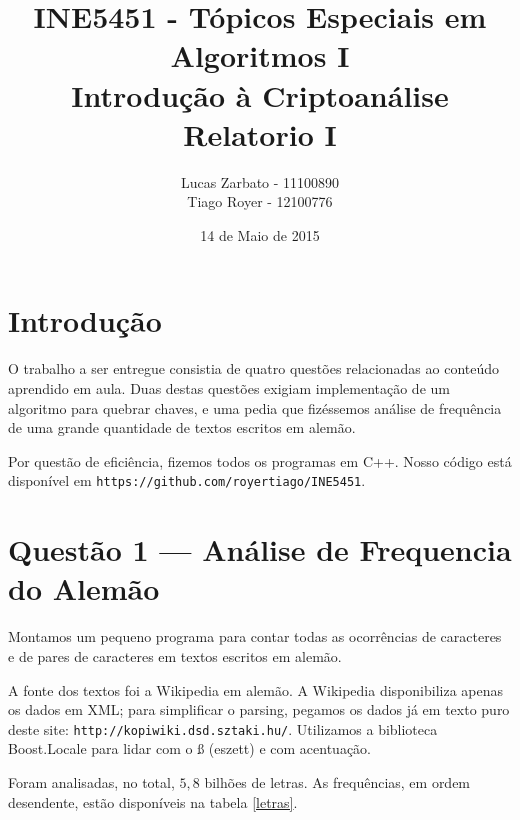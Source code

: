 \documentclass{article}
\title{
    INE5451 - Tópicos Especiais em Algoritmos I \\
    Introdução à Criptoanálise \\
    Relatorio I
}
\author{
    Lucas Zarbato - 11100890\\
    Tiago Royer - 12100776
}
\date{14 de Maio de 2015}
\begin{document}
\maketitle

\section{Introdução}

O trabalho a ser entregue consistia de quatro questões
relacionadas ao conteúdo aprendido em aula.
Duas destas questões exigiam implementação
de um algoritmo para quebrar chaves,
e uma pedia que fizéssemos análise de frequência
de uma grande quantidade de textos escritos em alemão.

Por questão de eficiência, fizemos todos os programas em C++.
Nosso código está disponível em \texttt{https://github.com/royertiago/INE5451}.

\section{Questão 1 --- Análise de Frequencia do Alemão}

Montamos um pequeno programa para contar todas as ocorrências de caracteres
e de pares de caracteres em textos escritos em alemão.

A fonte dos textos foi a Wikipedia em alemão.
A Wikipedia disponibiliza apenas os dados em XML;
para simplificar o parsing, pegamos os dados já em texto puro
deste site: \texttt{http://kopiwiki.dsd.sztaki.hu/}.
Utilizamos a biblioteca Boost.Locale para lidar com o ß (eszett)
e com acentuação.

Foram analisadas, no total, $5,8$ bilhões de letras.
As frequências, em ordem desendente, estão disponíveis na tabela \ref{letras}.
\end{document}
